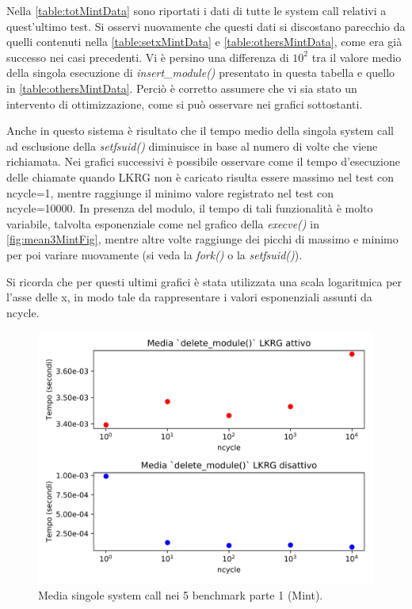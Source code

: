 Nella \autoref{table:totMintData} sono riportati i dati di tutte le system call relativi a quest'ultimo test. Si osservi nuovamente che questi dati si discostano parecchio da quelli contenuti nella \autoref{table:setxMintData} e \autoref{table:othersMintData}, come era già successo nei casi precedenti. Vi è persino una differenza di $10^{2}$ tra il valore medio della singola esecuzione di \emph{insert\_module()} presentato in questa tabella e quello in \autoref{table:othersMintData}. Perciò è corretto assumere che vi sia stato un intervento di ottimizzazione, come si può osservare nei grafici sottostanti.

Anche in questo sistema è risultato che il tempo medio della singola system call ad esclusione della \emph{setfsuid()} diminuisce in base al numero di volte che viene richiamata. Nei grafici successivi è possibile osservare come il tempo d'esecuzione delle chiamate quando LKRG non è caricato risulta essere massimo nel test con ncycle=1, mentre raggiunge il minimo valore registrato nel test con ncycle=10000. In presenza del modulo, il tempo di tali funzionalità è molto variabile, talvolta esponenziale come nel grafico della \emph{execve()} in \autoref{fig:mean3MintFig}, mentre altre volte raggiunge dei picchi di massimo e minimo per poi variare nuovamente (si veda la \emph{fork()} o la \emph{setfsuid()}).

Si ricorda che per questi ultimi grafici è stata utilizzata una scala logaritmica per l'asse delle x, in modo tale da rappresentare i valori esponenziali assunti da ncycle.

\begin{figure}[!htbp]
\centering
\includegraphics[scale=0.25]{Figures/Mint/Mean1}
\caption[Media singole system call nei 5 benchmark parte 1 (Mint)]{Media singole system call nei 5 benchmark parte 1 (Mint).}
\label{fig:mean1MintFig}
\end{figure}

